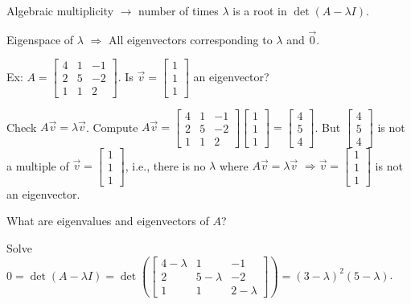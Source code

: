 \documentclass{article}
\begin{document}
Algebraic multiplicity \( \rightarrow \) number of times \( \lambda \) is a root in \( \det(A-\lambda I) \).

Eigenspace of \( \lambda \) \( \Rightarrow \) All eigenvectors corresponding to \( \lambda \) and \( \vec{0} \).

Ex: \( A = \begin{bmatrix} 4 & 1 & -1 \\ 2 & 5 & -2 \\ 1 & 1 & 2 \end{bmatrix} \). Is \( \vec{v} = \begin{bmatrix} 1 \\ 1 \\ 1 \end{bmatrix} \) an eigenvector?

Check \( A\vec{v} = \lambda\vec{v} \). Compute \( A\vec{v} = \begin{bmatrix} 4 & 1 & -1 \\ 2 & 5 & -2 \\ 1 & 1 & 2 \end{bmatrix} \begin{bmatrix} 1 \\ 1 \\ 1 \end{bmatrix} = \begin{bmatrix} 4 \\ 5 \\ 4 \end{bmatrix} \). But \( \begin{bmatrix} 4 \\ 5 \\ 4 \end{bmatrix} \) is not a multiple of \( \vec{v} = \begin{bmatrix} 1 \\ 1 \\ 1 \end{bmatrix} \), i.e., there is no \( \lambda \) where \( A\vec{v} = \lambda\vec{v} \) \( \Rightarrow \vec{v} = \begin{bmatrix} 1 \\ 1 \\ 1 \end{bmatrix} \) is not an eigenvector.

What are eigenvalues and eigenvectors of \( A \)?

Solve \( 0 = \det(A-\lambda I) = \det\left( \begin{bmatrix} 4-\lambda & 1 & -1 \\ 2 & 5-\lambda & -2 \\ 1 & 1 & 2-\lambda \end{bmatrix} \right) = (3-\lambda)^2(5-\lambda) \).
\end{document}

